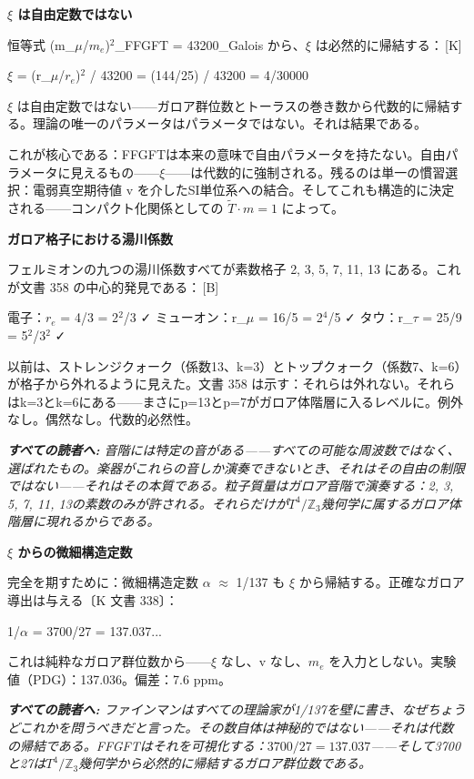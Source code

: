 \documentclass[11pt,openany]{book}
\newcommand{\status}[1]{\penalty10000\,{\tiny\textcolor{gray!70}{[#1]}}}
\newenvironment{laierspur}{%
  \par\vspace{4pt}%
  \noindent\small\itshape\color{blue!60!black}%
  \textbf{すべての読者へ:}\enspace\ignorespaces}{%
  \par\vspace{4pt}\normalsize\normalfont\normalcolor}
\begin{document}
\textbf{$\xi$ は自由定数ではない}

恒等式 (m\_$\mu$/$m_e$)$^2$\_FFGFT = 43200\_Galois から、$\xi$ は必然的に帰結する：\status{K}

$\xi$ = (r\_$\mu$/$r_e$)$^2$ / 43200 = (144/25) / 43200 = 4/30000

$\xi$ は自由定数ではない——ガロア群位数とトーラスの巻き数から代数的に帰結する。理論の唯一のパラメータはパラメータではない。それは結果である。

これが核心である：FFGFTは本来の意味で自由パラメータを持たない。自由パラメータに見えるもの——$\xi$——は代数的に強制される。残るのは単一の慣習選択：電弱真空期待値 v を介したSI単位系への結合。そしてこれも構造的に決定される——コンパクト化関係としての $\tilde{T}\cdot m = 1$ によって。

\textbf{ガロア格子における湯川係数}

フェルミオンの九つの湯川係数すべてが素数格子 {2, 3, 5, 7, 11, 13} にある。これが文書 358 の中心的発見である：\status{B}

電子：$r_e$ = 4/3 = 2$^2$/3 ✓
ミューオン：r\_$\mu$ = 16/5 = 2$^4$/5 ✓
タウ：r\_$\tau$ = 25/9 = 5$^2$/3$^2$ ✓

以前は、ストレンジクォーク（係数13、k=3）とトップクォーク（係数7、k=6）が格子から外れるように見えた。文書 358 は示す：それらは外れない。それらはk=3とk=6にある——まさにp=13とp=7がガロア体階層に入るレベルに。例外なし。偶然なし。代数的必然性。

\begin{laierspur}
音階には特定の音がある——すべての可能な周波数ではなく、選ばれたもの。楽器がこれらの音しか演奏できないとき、それはその自由の制限ではない——それはその本質である。粒子質量はガロア音階で演奏する：{2, 3, 5, 7, 11, 13}の素数のみが許される。それらだけが$T^4/\mathbb{Z}_3$幾何学に属するガロア体階層に現れるからである。
\end{laierspur}

\textbf{$\xi$ からの微細構造定数}

完全を期すために：微細構造定数 $\alpha$ $\approx$ 1/137 も $\xi$ から帰結する。正確なガロア導出は与える〔K 文書 338〕：

1/$\alpha$ = 3700/27 = 137.037...

これは純粋なガロア群位数から——$\xi$ なし、v なし、$m_e$ を入力としない。実験値（PDG）：137.036。偏差：7.6 ppm。

\begin{laierspur}
ファインマンはすべての理論家が1/137を壁に書き、なぜちょうどこれかを問うべきだと言った。その数自体は神秘的ではない——それは代数の帰結である。FFGFTはそれを可視化する：$3700/27 = 137.037$——そして3700と27は$T^4/\mathbb{Z}_3$幾何学から必然的に帰結するガロア群位数である。
\end{laierspur}
\end{document}
